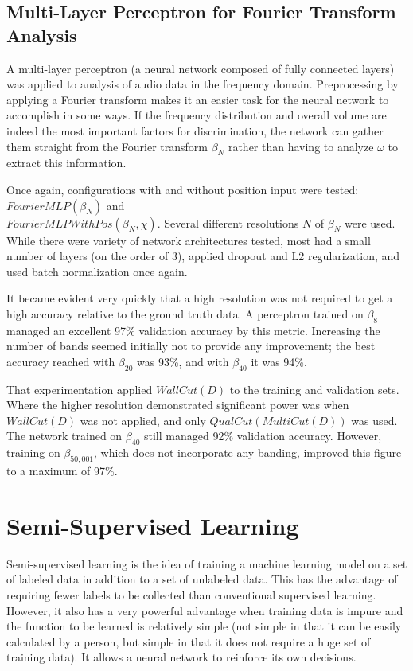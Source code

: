 \documentclass[10pt]{article}
\begin{document}
\subsection{Multi-Layer Perceptron for Fourier Transform Analysis}

A multi-layer perceptron (a neural network composed of fully connected layers) was applied to analysis of audio data in the frequency domain. Preprocessing by applying a Fourier transform makes it an easier task for the neural network to accomplish in some ways. If the frequency distribution and overall volume are indeed the most important factors for discrimination, the network can gather them straight from the Fourier transform $\beta_{N}$ rather than having to analyze $\omega$ to extract this information.

Once again, configurations with and without position input were tested: $FourierMLP(\beta_{N})$ and \\ $FourierMLPWithPos(\beta_{N}, \chi)$. Several different resolutions $N$ of $\beta_{N}$ were used. While there were variety of network architectures tested, most had a small number of layers (on the order of 3), applied dropout and L2 regularization, and used batch normalization once again.

It became evident very quickly that a high resolution was not required to get a high accuracy relative to the ground truth data. A perceptron trained on $\beta_{8}$ managed an excellent 97\% validation accuracy by this metric. Increasing the number of bands seemed initially not to provide any improvement; the best accuracy reached with $\beta_{20}$ was 93\%, and with $\beta_{40}$ it was 94\%.

That experimentation applied $WallCut(D)$ to the training and validation sets. Where the higher resolution demonstrated significant power was when $WallCut(D)$ was not applied, and only $QualCut(MultiCut(D))$ was used. The network trained on $\beta_{40}$ still managed 92\% validation accuracy. However, training on $\beta_{50,001}$, which does not incorporate any banding, improved this figure to a maximum of 97\%.

\section{Semi-Supervised Learning}

Semi-supervised learning is the idea of training a machine learning model on a set of labeled data in addition to a set of unlabeled data. This has the advantage of requiring fewer labels to be collected than conventional supervised learning. However, it also has a very powerful advantage when training data is impure and the function to be learned is relatively simple (not simple in that it can be easily calculated by a person, but simple in that it does not require a huge set of training data). It allows a neural network to reinforce its own decisions.
\end{document}
